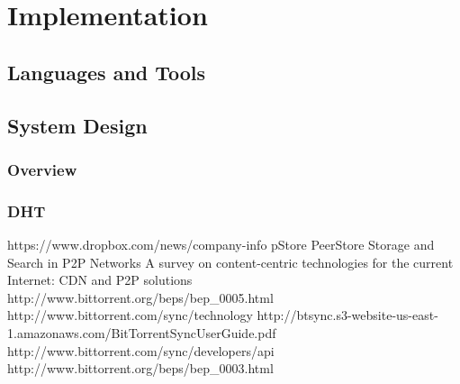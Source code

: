 \documentclass[12pt]{report}
\begin{document}
\chapter{Implementation}
\section{Languages and Tools}
\section{System Design}
\subsection{Overview}
\subsection{}
\subsection{DHT}

\begin{thebibliography}{1}

 https://www.dropbox.com/news/company-info
 pStore
 PeerStore
 Storage and Search in P2P Networks
 A survey on content-centric technologies for the current Internet: CDN and P2P solutions
 http://www.bittorrent.org/beps/bep\_0005.html
 http://www.bittorrent.com/sync/technology
 http://btsync.s3-website-us-east-1.amazonaws.com/BitTorrentSyncUserGuide.pdf
 http://www.bittorrent.com/sync/developers/api
 http://www.bittorrent.org/beps/bep\_0003.html

\end{thebibliography}
\end{document}
